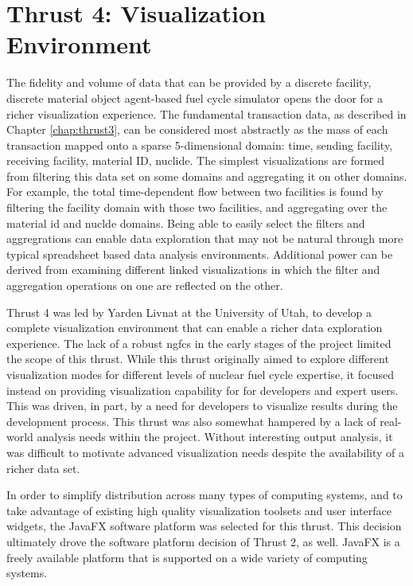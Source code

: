\chapter{Thrust 4: Visualization Environment}\label{chap:thrust4}

The fidelity and volume of data that can be provided by a discrete facility,
discrete material object agent-based fuel cycle simulator opens the door for a
richer visualization experience.  The fundamental transaction data, as
described in Chapter \ref{chap:thrust3}, can be considered most abstractly as
the mass of each transaction mapped onto a sparse 5-dimensional domain: time,
sending facility, receiving facility, material ID, nuclide.  The simplest
visualizations are formed from filtering this data set on some domains and
aggregating it on other domains.  For example, the total time-dependent flow
between two facilities is found by filtering the facility domain with those
two facilities, and aggregating over the material id and nuclde domains.
Being able to easily select the filters and aggregrations can enable data
exploration that may not be natural through more typical spreadsheet based
data analysis environments.  Additional power can be derived from examining
different linked visualizations in which the filter and aggregation operations
on one are reflected on the other.

Thrust 4 was led by Yarden Livnat at the University of Utah, to develop a
complete visualization environment that can enable a richer data exploration
experience.  The lack of a robust \gls{ngfcs} in the early stages of the
project limited the scope of this thrust.  While this thrust originally aimed
to explore different visualization modes for different levels of nuclear fuel
cycle expertise, it focused instead on providing visualization capability for
\Cyclus for developers and expert users.  This was driven, in part, by a need
for \Cyclus developers to visualize results during the development process.
This thrust was also somewhat hampered by a lack of real-world analysis needs
within the project.  Without interesting output analysis, it was difficult to
motivate advanced visualization needs despite the availability of a richer
data set.

In order to simplify distribution across many types of computing systems, and
to take advantage of existing high quality visualization toolsets and user
interface widgets, the JavaFX software platform was selected for this thrust.
This decision ultimately drove the software platform decision of Thrust 2, as
well.  JavaFX is a freely available platform that is supported on a wide
variety of computing systems.

